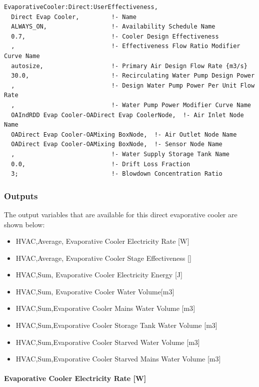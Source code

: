 \begin{lstlisting}
EvaporativeCooler:Direct:UserEffectiveness,
  Direct Evap Cooler,         !- Name
  ALWAYS_ON,                  !- Availability Schedule Name
  0.7,                        !- Cooler Design Effectiveness
  ,                           !- Effectiveness Flow Ratio Modifier Curve Name
  autosize,                   !- Primary Air Design Flow Rate {m3/s}
  30.0,                       !- Recirculating Water Pump Design Power
  ,                           !- Design Water Pump Power Per Unit Flow Rate
  ,                           !- Water Pump Power Modifier Curve Name
  OAIndRDD Evap Cooler-OADirect Evap CoolerNode,  !- Air Inlet Node Name
  OADirect Evap Cooler-OAMixing BoxNode,  !- Air Outlet Node Name
  OADirect Evap Cooler-OAMixing BoxNode,  !- Sensor Node Name
  ,                           !- Water Supply Storage Tank Name
  0.0,                        !- Drift Loss Fraction
  3;                          !- Blowdown Concentration Ratio
\end{lstlisting}

\subsubsection{Outputs}\label{outputs-1-009}

The output variables that are available for this direct evaporative cooler are shown below:

\begin{itemize}
\item
  HVAC,Average, Evaporative Cooler Electricity Rate {[}W{]}
\item
  HVAC,Average, Evaporative Cooler Stage Effectiveness {[]}
\item
  HVAC,Sum, Evaporative Cooler Electricity Energy {[}J{]}
\item
  HVAC,Sum, Evaporative Cooler Water Volume{[}m3{]}
\item
  HVAC,Sum,Evaporative Cooler Mains Water Volume {[}m3{]}
\item
  HVAC,Sum,Evaporative Cooler Storage Tank Water Volume {[}m3{]}
\item
  HVAC,Sum,Evaporative Cooler Starved Water Volume {[}m3{]}
\item
  HVAC,Sum,Evaporative Cooler Starved Mains Water Volume {[}m3{]}
\end{itemize}

\paragraph{Evaporative Cooler Electricity Rate {[}W{]}}\label{evaporative-cooler-electric-powerw-1}

